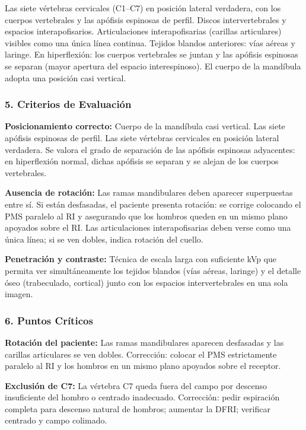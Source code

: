 	Las siete vértebras cervicales (C1--C7) en posición lateral verdadera, con los cuerpos vertebrales y las apófisis espinosas de perfil. Discos intervertebrales y espacios interapofisarios. Articulaciones interapofisarias (carillas articulares) visibles como una única línea continua. Tejidos blandos anteriores: vías aéreas y laringe. En hiperflexión: los cuerpos vertebrales se juntan y las apófisis espinosas se separan (mayor apertura del espacio interespinoso). El cuerpo de la mandíbula adopta una posición casi vertical.
	
	\subsubsection*{5. Criterios de Evaluación}
	
	\textbf{Posicionamiento correcto:} Cuerpo de la mandíbula casi vertical. Las siete apófisis espinosas de perfil. Las siete vértebras cervicales en posición lateral verdadera. Se valora el grado de separación de las apófisis espinosas adyacentes: en hiperflexión normal, dichas apófisis se separan y se alejan de los cuerpos vertebrales.
	
	\textbf{Ausencia de rotación:} Las ramas mandibulares deben aparecer superpuestas entre sí. Si están desfasadas, el paciente presenta rotación: se corrige colocando el PMS paralelo al RI y asegurando que los hombros queden en un mismo plano apoyados sobre el RI. Las articulaciones interapofisarias deben verse como una única línea; si se ven dobles, indica rotación del cuello.
	
	\textbf{Penetración y contraste:} Técnica de escala larga con suficiente kVp que permita ver simultáneamente los tejidos blandos (vías aéreas, laringe) y el detalle óseo (trabeculado, cortical) junto con los espacios intervertebrales en una sola imagen.
	
	\subsubsection*{6. Puntos Críticos}
	
	\textbf{Rotación del paciente:} Las ramas mandibulares aparecen desfasadas y las carillas articulares se ven dobles. Corrección: colocar el PMS estrictamente paralelo al RI y los hombros en un mismo plano apoyados sobre el receptor.
	
	\textbf{Exclusión de C7:} La vértebra C7 queda fuera del campo por descenso insuficiente del hombro o centrado inadecuado. Corrección: pedir espiración completa para descenso natural de hombros; aumentar la DFRI; verificar centrado y campo colimado.
	
